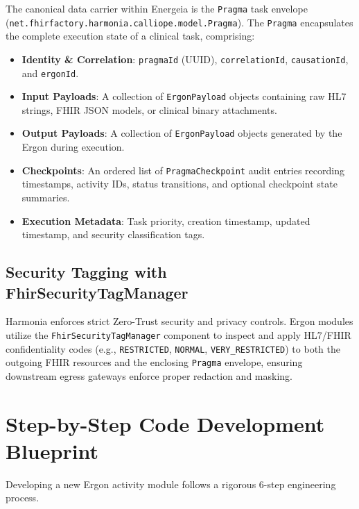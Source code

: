 The canonical data carrier within Energeia is the \texttt{Pragma} task envelope (\texttt{net.fhirfactory.harmonia.calliope.model.Pragma}). The \texttt{Pragma} encapsulates the complete execution state of a clinical task, comprising:
\begin{itemize}
    \item \textbf{Identity \& Correlation}: \texttt{pragmaId} (UUID), \texttt{correlationId}, \texttt{causationId}, and \texttt{ergonId}.
    \item \textbf{Input Payloads}: A collection of \texttt{ErgonPayload} objects containing raw HL7 strings, FHIR JSON models, or clinical binary attachments.
    \item \textbf{Output Payloads}: A collection of \texttt{ErgonPayload} objects generated by the Ergon during execution.
    \item \textbf{Checkpoints}: An ordered list of \texttt{PragmaCheckpoint} audit entries recording timestamps, activity IDs, status transitions, and optional checkpoint state summaries.
    \item \textbf{Execution Metadata}: Task priority, creation timestamp, updated timestamp, and security classification tags.
\end{itemize}

\subsection{Security Tagging with FhirSecurityTagManager}

Harmonia enforces strict Zero-Trust security and privacy controls. Ergon modules utilize the \texttt{FhirSecurityTagManager} component to inspect and apply HL7/FHIR confidentiality codes (e.g., \texttt{RESTRICTED}, \texttt{NORMAL}, \texttt{VERY\_RESTRICTED}) to both the outgoing FHIR resources and the enclosing \texttt{Pragma} envelope, ensuring downstream egress gateways enforce proper redaction and masking.

\section{Step-by-Step Code Development Blueprint}
\label{sec:ergon_blueprint}

Developing a new Ergon activity module follows a rigorous 6-step engineering process.

